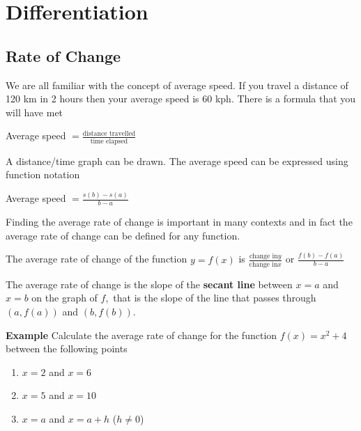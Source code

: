 \chapter[Differentiation]{Differentiation}

\section{Rate of Change}
We are all familiar with the concept of average speed. If you travel a distance of 120 km in 2 hours then your average speed is 60 kph. There is a formula that you will have met 

\begin{center}
Average speed $ =\frac{\text{distance travelled}}{\text{time elapsed}}$
\end{center}\par
A distance/time graph can be drawn. The average speed can be expressed using function notation 

\begin{center}
Average speed $ =\frac{s (b) -s (a)}{b -a}$
\end{center}\par
Finding the average rate of change is important in many contexts and in fact the average rate of change can be defined for any function. 

The average rate of change of the function $y =f (x)$ is $\frac{\text{change in}y}{\text{change in}x}$ or $\frac{f (b) -f (a)}{b -a}$ 

The average rate of change is the slope of the \textbf{secant line} between $x =a$ and $x =b$ on the graph of $f$,\ that is the slope of the line that passes through $(a ,f (a))$ and $(b ,f (b))$. 

\textbf{Example} Calculate the average rate of change for the function $f (x) =x^{2} +4$ between the following points
\begin{enumerate}
\item $x =2$ and $x =6$ 

\item $x =5$ and $x =10$ 

\item $x =a$ and $x =a +h$ ($h \neq 0$) 
\end{enumerate}

% 
